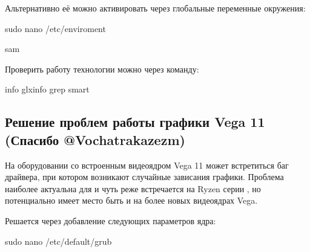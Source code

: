 \documentclass[letterpaper,10pt,russian,openany]{sphinxmanual}
\begin{document}
\sphinxAtStartPar
Альтернативно её можно активировать через глобальные переменные окружения:

\begin{sphinxVerbatim}[commandchars=\\\{\}]
sudo nano /etc/enviroment 

sam
\end{sphinxVerbatim}

\sphinxAtStartPar
Проверить работу технологии можно через команду:

\begin{sphinxVerbatim}[commandchars=\\\{\}]
info glxinfo  grep smart 
\end{sphinxVerbatim}

\sphinxAtStartPar
{}

\sphinxAtStartPar
{}

\ignorespaces 

\subsection{Решение проблем работы графики Vega 11 (Спасибо @Vochatrak\sphinxhyphen{}az\sphinxhyphen{}ezm)}
\label{\detokenize{source/generic-system-acceleration:vega-11-vochatrak-az-ezm}}\label{\detokenize{source/generic-system-acceleration:bug-solution-for-vega}}\label{\detokenize{source/generic-system-acceleration:index-13}}
\sphinxAtStartPar
На оборудовании со встроенным видеоядром Vega 11 может встретиться баг драйвера, при котором возникают случайные зависания графики.
Проблема наиболее актуальна для  и чуть реже встречается на Ryzen серии , но потенциально имеет место быть и на более
новых видеоядрах Vega.

\sphinxAtStartPar
Решается через добавление следующих параметров ядра:

\begin{sphinxVerbatim}[commandchars=\\\{\}]
sudo nano /etc/default/grub

\end{sphinxVerbatim}
\end{document}
